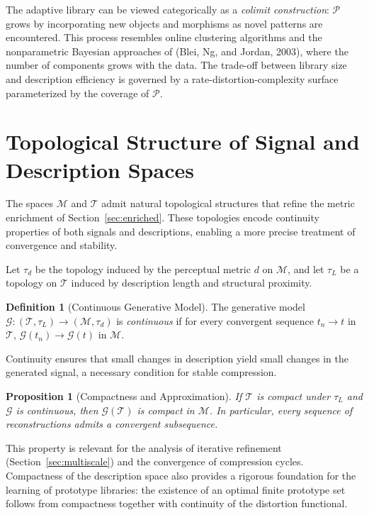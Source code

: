 \documentclass[11pt,a4paper]{article}
\newtheorem{proposition}[theorem]{Proposition}
\theoremstyle{definition}
\newtheorem{definition}[theorem]{Definition}
\theoremstyle{remark}
\begin{document}
The adaptive library can be viewed categorically as a \emph{colimit construction}: $\mathcal{P}$ grows by incorporating new objects and morphisms as novel patterns are encountered. This process resembles online clustering algorithms and the nonparametric Bayesian approaches of (Blei, Ng, and Jordan, 2003), where the number of components grows with the data. The trade-off between library size and description efficiency is governed by a rate-distortion-complexity surface parameterized by the coverage of $\mathcal{P}$.

\section{Topological Structure of Signal and Description Spaces}
\label{sec:topology}

The spaces $\mathcal{M}$ and $\mathcal{T}$ admit natural topological structures that refine the metric enrichment of Section~\ref{sec:enriched}. These topologies encode continuity properties of both signals and descriptions, enabling a more precise treatment of convergence and stability.

Let $\tau_d$ be the topology induced by the perceptual metric $d$ on $\mathcal{M}$, and let $\tau_L$ be a topology on $\mathcal{T}$ induced by description length and structural proximity.

\begin{definition}[Continuous Generative Model]
The generative model $\mathcal{G} : (\mathcal{T}, \tau_L) \to (\mathcal{M}, \tau_d)$ is \emph{continuous} if for every convergent sequence $t_n \to t$ in $\mathcal{T}$, $\mathcal{G}(t_n) \to \mathcal{G}(t)$ in $\mathcal{M}$.
\end{definition}

Continuity ensures that small changes in description yield small changes in the generated signal, a necessary condition for stable compression.

\begin{proposition}[Compactness and Approximation]
If $\mathcal{T}$ is compact under $\tau_L$ and $\mathcal{G}$ is continuous, then $\mathcal{G}(\mathcal{T})$ is compact in $\mathcal{M}$. In particular, every sequence of reconstructions admits a convergent subsequence.
\end{proposition}

This property is relevant for the analysis of iterative refinement (Section~\ref{sec:multiscale}) and the convergence of compression cycles. Compactness of the description space also provides a rigorous foundation for the learning of prototype libraries: the existence of an optimal finite prototype set follows from compactness together with continuity of the distortion functional.
\end{document}
